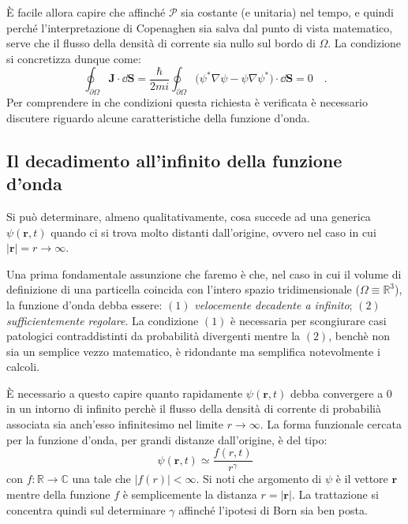 È facile allora capire che affinché $\mathcal{P}$ sia costante (e unitaria) nel tempo, e quindi perché l'interpretazione di Copenaghen sia salva dal punto di vista matematico, serve che il flusso della densità di corrente sia nullo sul bordo di $\Omega$. La condizione si concretizza dunque come:
\[
    \oint_{\partial \Omega} \bm{J} \cdot \dd{\bm{S}} = \frac{\hbar}{2mi} \oint_{\partial \Omega} \big(\psi^*\nabla\psi - \psi\nabla\psi^*\big) \cdot \dd{\bm{S}} = 0 \quad.  
\]
Per comprendere in che condizioni questa richiesta è verificata è necessario discutere riguardo alcune caratteristiche della funzione d'onda.

\subsection{Il decadimento all'infinito della funzione d'onda}
Si può determinare, almeno qualitativamente, cosa succede ad una generica $\psi(\bm{r},t)$ quando ci si trova molto distanti dall'origine, ovvero nel caso in cui $|\bm{r}| = r \to \infty$. 

Una prima fondamentale assunzione che faremo è che, nel caso in cui il volume di definizione di una particella coincida con l'intero spazio tridimensionale ($\Omega \equiv \mathbb{R}^3$), la funzione d'onda debba essere: $(1)$ \emph{velocemente decadente a infinito}; $(2)$ \emph{sufficientemente regolare}. La condizione $(1)$ è necessaria per scongiurare casi patologici contraddistinti da probabilità divergenti mentre la $(2)$, benchè non sia un semplice vezzo matematico, è ridondante ma semplifica notevolmente i calcoli. 

È necessario a questo capire quanto rapidamente $\psi(\bm{r},t)$ debba convergere a $0$ in un intorno di infinito perchè il flusso della densità di corrente di probabilià associata sia anch'esso infinitesimo nel limite $r \to \infty$. La forma funzionale cercata per la funzione d'onda, per grandi distanze dall'origine, è del tipo: 
\begin{equation}
        \psi(\bm{r},t) \simeq \frac{f(r,t)}{r^\gamma} 
        \label{eq:psi_r_grande}
\end{equation} 
con $f:\mathbb{R} \to \mathbb{C}$ una tale che $|f(r)| < \infty$. Si noti che argomento di $\psi$ è il vettore $\bm{r}$ mentre della funzione $f$ è semplicemente la distanza $r = |\bm{r}|$. La trattazione si concentra quindi sul determinare $\gamma$ affinché l'ipotesi di Born sia ben posta. 

